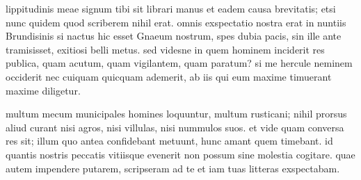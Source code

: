 


 lippitudinis meae signum tibi sit librari manus et eadem causa brevitatis; etsi nunc quidem quod scriberem nihil erat. omnis exspectatio nostra erat in nuntiis Brundisinis si nactus hic esset Gnaeum nostrum, spes dubia pacis, sin ille ante tramisisset, exitiosi belli metus. sed videsne in quem hominem inciderit res publica, quam acutum, quam vigilantem, quam paratum? si me hercule neminem occiderit nec cuiquam quicquam ademerit, ab iis qui eum maxime timuerant maxime diligetur.

 multum mecum municipales homines loquuntur, multum rusticani; nihil prorsus aliud curant nisi agros, nisi villulas, nisi nummulos suos. et vide quam conversa res sit; illum quo antea confidebant metuunt, hunc amant quem timebant. id quantis nostris peccatis vitiisque evenerit non possum sine molestia cogitare. quae autem impendere putarem, scripseram ad te et iam tuas litteras exspectabam.
